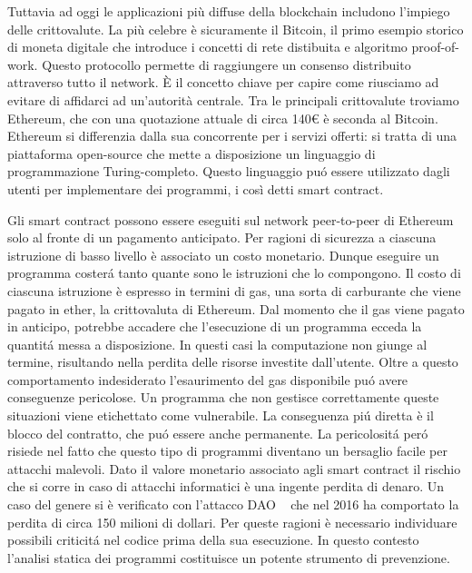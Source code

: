 
\indent Tuttavia ad oggi le applicazioni più diffuse della blockchain includono l'impiego delle crittovalute. La più celebre è sicuramente il Bitcoin, il primo esempio storico di moneta digitale che introduce i concetti di rete distibuita e algoritmo proof-of-work. Questo protocollo permette di raggiungere un consenso distribuito attraverso tutto il network. \`E il concetto chiave per capire come riusciamo ad evitare di affidarci ad un'autorità centrale.\newline
\indent Tra le principali crittovalute troviamo Ethereum, che con una quotazione attuale di circa 140\euro{} è seconda al Bitcoin. Ethereum si differenzia dalla sua concorrente per i servizi offerti: si tratta di una piattaforma open-source che mette a disposizione un linguaggio di programmazione Turing-completo. Questo linguaggio puó essere utilizzato dagli utenti per implementare dei programmi, i così detti smart contract.\newline

\indent Gli smart contract possono essere eseguiti sul network peer-to-peer di Ethereum solo al fronte di un pagamento anticipato. Per ragioni di sicurezza a ciascuna istruzione di basso livello è associato un costo monetario. Dunque eseguire un programma costerá tanto quante sono le istruzioni che lo compongono. Il costo di ciascuna istruzione è espresso in termini di gas, una sorta di carburante che viene pagato in ether, la crittovaluta di Ethereum. Dal momento che il gas viene pagato in anticipo, potrebbe accadere che l'esecuzione di un programma ecceda la quantitá messa a disposizione. In questi casi la computazione non giunge al termine, risultando nella perdita delle risorse investite dall'utente. Oltre a questo comportamento indesiderato l'esaurimento del gas disponibile puó avere conseguenze pericolose. Un programma che non gestisce correttamente queste situazioni viene etichettato come vulnerabile. La conseguenza piú diretta è il blocco del contratto, che puó essere anche permanente. La pericolositá peró risiede nel fatto che questo tipo di programmi diventano un bersaglio facile per attacchi malevoli. Dato il valore monetario associato agli smart contract il rischio che si corre in caso di attacchi informatici è una ingente perdita di denaro. Un caso del genere si è verificato con l'attacco DAO ~\cite{daian2016dao} che nel 2016 ha comportato la perdita di circa 150 milioni di dollari.\newline 
\indent Per queste ragioni è necessario individuare possibili criticitá nel codice prima della sua esecuzione. In questo contesto l'analisi statica dei programmi costituisce un potente strumento di prevenzione.\newline

